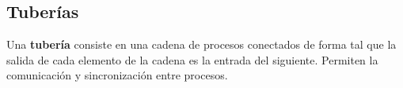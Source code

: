 \subsection{Tuberías}
Una \textbf{tubería} consiste en una cadena de procesos conectados de forma tal que la salida de cada elemento de la cadena es la entrada del siguiente. Permiten la comunicación y sincronización entre procesos.\\

